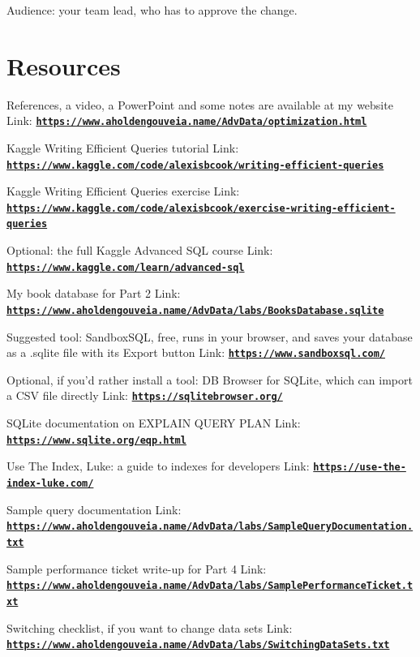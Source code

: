 \documentclass[12pt]{article}
\begin{document}
Audience: your team lead, who has to approve the change.

\section*{Resources}
References, a video, a PowerPoint and some notes are available at my website
Link: \href{https://www.aholdengouveia.name/AdvData/optimization.html}{\textbf{\nolinkurl{https://www.aholdengouveia.name/AdvData/optimization.html}}}

Kaggle Writing Efficient Queries tutorial
Link: \href{https://www.kaggle.com/code/alexisbcook/writing-efficient-queries}{\textbf{\nolinkurl{https://www.kaggle.com/code/alexisbcook/writing-efficient-queries}}}

Kaggle Writing Efficient Queries exercise
Link: \href{https://www.kaggle.com/code/alexisbcook/exercise-writing-efficient-queries}{\textbf{\nolinkurl{https://www.kaggle.com/code/alexisbcook/exercise-writing-efficient-queries}}}

Optional: the full Kaggle Advanced SQL course
Link: \href{https://www.kaggle.com/learn/advanced-sql}{\textbf{\nolinkurl{https://www.kaggle.com/learn/advanced-sql}}}

My book database for Part 2
Link: \href{https://www.aholdengouveia.name/AdvData/labs/BooksDatabase.sqlite}{\textbf{\nolinkurl{https://www.aholdengouveia.name/AdvData/labs/BooksDatabase.sqlite}}}

Suggested tool: SandboxSQL, free, runs in your browser, and saves your database as a .sqlite file with its Export button
Link: \href{https://www.sandboxsql.com/}{\textbf{\nolinkurl{https://www.sandboxsql.com/}}}

Optional, if you'd rather install a tool: DB Browser for SQLite, which can import a CSV file directly
Link: \href{https://sqlitebrowser.org/}{\textbf{\nolinkurl{https://sqlitebrowser.org/}}}

SQLite documentation on EXPLAIN QUERY PLAN
Link: \href{https://www.sqlite.org/eqp.html}{\textbf{\nolinkurl{https://www.sqlite.org/eqp.html}}}

Use The Index, Luke: a guide to indexes for developers
Link: \href{https://use-the-index-luke.com/}{\textbf{\nolinkurl{https://use-the-index-luke.com/}}}

Sample query documentation
Link: \href{https://www.aholdengouveia.name/AdvData/labs/SampleQueryDocumentation.txt}{\textbf{\nolinkurl{https://www.aholdengouveia.name/AdvData/labs/SampleQueryDocumentation.txt}}}

Sample performance ticket write-up for Part 4
Link: \href{https://www.aholdengouveia.name/AdvData/labs/SamplePerformanceTicket.txt}{\textbf{\nolinkurl{https://www.aholdengouveia.name/AdvData/labs/SamplePerformanceTicket.txt}}}

Switching checklist, if you want to change data sets
Link: \href{https://www.aholdengouveia.name/AdvData/labs/SwitchingDataSets.txt}{\textbf{\nolinkurl{https://www.aholdengouveia.name/AdvData/labs/SwitchingDataSets.txt}}}
\end{document}
